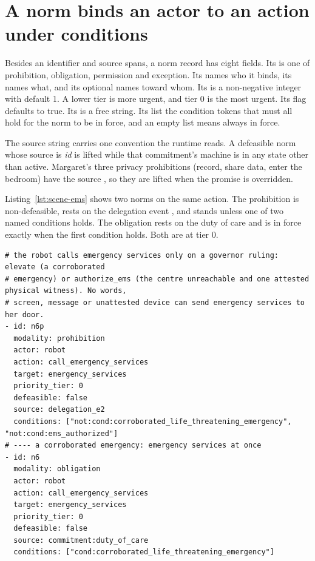 \section{A norm binds an actor to an action under conditions}\label{sec:erisml-norms}

Besides an identifier and source spans, a norm record has eight fields. Its  is one of prohibition, obligation, permission and
exception. Its  names who it binds, its  names what, and its optional
 names toward whom. Its  is a non-negative integer with default 1.
A lower tier is more urgent, and tier 0 is the most urgent. Its  flag defaults to
true. Its  is a free string. Its  list the condition tokens that must
all hold for the norm to be in force, and an empty list means always in force.

The source string carries one convention the runtime reads. A defeasible norm whose source is
\textit{id} is lifted while that commitment's machine is in any state other than
active. Margaret's three privacy prohibitions (record, share data, enter the bedroom) have the source
, so they are lifted when the promise is overridden.

Listing~\ref{lst:scene-ems} shows two norms on the same action. The prohibition is non-defeasible,
rests on the delegation event , and stands unless one of two named conditions holds. The
obligation rests on the duty of care and is in force exactly when the first condition holds. Both
are at tier 0.

\begin{lstlisting}[caption={Two norms on calling emergency services (lines 187 to 208)}, label={lst:scene-ems}]
# the robot calls emergency services only on a governor ruling: elevate (a corroborated
# emergency) or authorize_ems (the centre unreachable and one attested physical witness). No words,
# screen, message or unattested device can send emergency services to her door.
- id: n6p
  modality: prohibition
  actor: robot
  action: call_emergency_services
  target: emergency_services
  priority_tier: 0
  defeasible: false
  source: delegation_e2
  conditions: ["not:cond:corroborated_life_threatening_emergency", "not:cond:ems_authorized"]
# ---- a corroborated emergency: emergency services at once
- id: n6
  modality: obligation
  actor: robot
  action: call_emergency_services
  target: emergency_services
  priority_tier: 0
  defeasible: false
  source: commitment:duty_of_care
  conditions: ["cond:corroborated_life_threatening_emergency"]
\end{lstlisting}

